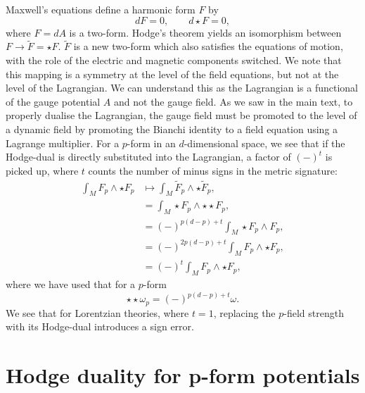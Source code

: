 Maxwell's equations define a harmonic form $F$ by
\begin{equation*}
	dF = 0, \qquad d \star F = 0,
\end{equation*} 
where $F = dA$ is a two-form. Hodge's theorem yields an isomorphism between $F \rightarrow \tilde{F} = \star F$. $\tilde{F}$ is a new two-form which also satisfies the equations of motion, with the role of the electric and magnetic components switched.  We note that this mapping is a symmetry at the level of the field equations, but not at the level of the Lagrangian. We can understand this as the Lagrangian is a functional of the gauge potential $A$ and not the gauge field. As we saw in the main text, to properly dualise the Lagrangian, the gauge field must be promoted to the level of a dynamic field by promoting the Bianchi identity to a field equation using a Lagrange multiplier. For a $p$-form in an $d$-dimensional space, we see that if the Hodge-dual is directly substituted into the Lagrangian, a factor of $(-)^t$ is picked up, where $t$ counts the number of minus signs in the metric signature:
\begin{equation*}
	\begin{aligned}
		\int_M F_p \wedge \star F_p &\mapsto \int_M \tilde{F}_p \wedge \star \tilde{F}_p, \\
		&= \int_M \star F_p \wedge \star \star F_p, \\
		&= (-)^{p(d-p) + t} \int_M \star F_p \wedge F_p,\\
		&= (-)^{2p(d-p) + t} \int_M F_p \wedge \star F_p, \\
		&= (-)^t \int_M F_p \wedge \star F_p,
	\end{aligned}
\end{equation*}
where we have used that for a $p$-form
\begin{equation}
\label{eq:Hodge2}
	\star \star \omega_p = (-)^{p(d-p) + t} \omega.
\end{equation}
We see that for Lorentzian theories, where $t = 1$, replacing the $p$-field strength with its Hodge-dual introduces a sign error.


\section{Hodge duality for p-form potentials}

